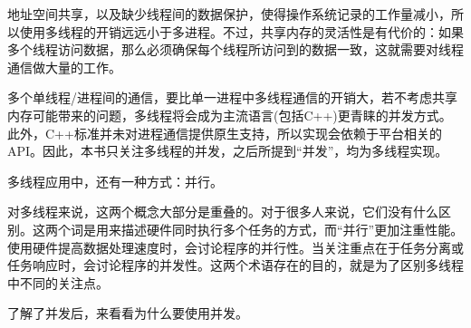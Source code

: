 地址空间共享，以及缺少线程间的数据保护，使得操作系统记录的工作量减小，所以使用多线程的开销远远小于多进程。不过，共享内存的灵活性是有代价的：如果多个线程访问数据，那么必须确保每个线程所访问到的数据一致，这就需要对线程通信做大量的工作。

多个单线程/进程间的通信，要比单一进程中多线程通信的开销大，若不考虑共享内存可能带来的问题，多线程将会成为主流语言(包括C++)更青睐的并发方式。此外，C++标准并未对进程通信提供原生支持，所以实现会依赖于平台相关的API。因此，本书只关注多线程的并发，之后所提到“并发”，均为多线程实现。

多线程应用中，还有一种方式：并行。


对多线程来说，这两个概念大部分是重叠的。对于很多人来说，它们没有什么区别。这两个词是用来描述硬件同时执行多个任务的方式，而“并行”更加注重性能。使用硬件提高数据处理速度时，会讨论程序的并行性。当关注重点在于任务分离或任务响应时，会讨论程序的并发性。这两个术语存在的目的，就是为了区别多线程中不同的关注点。

了解了并发后，来看看为什么要使用并发。